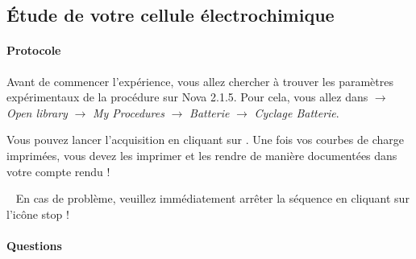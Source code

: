 \documentclass[twoside,a4paper,11pt,addpoints]{exam}%
\begin{document}
\subsection{\'{E}tude de votre cellule électrochimique}

\paragraph*{Protocole}
Avant de commencer l'expérience, vous allez chercher à trouver les paramètres expérimentaux de la procédure sur Nova 2.1.5. Pour cela, vous allez dans {\faHome $\to$ \emph{Open library} $\to$ \emph{My Procedures} $\to$ \emph{Batterie} $\to$ \emph{Cyclage Batterie}}.


Vous pouvez lancer l'acquisition en cliquant sur \faPlay. Une fois vos courbes de charge imprimées, vous devez les imprimer et les rendre de manière documentées dans votre compte rendu !

\faWarning ~ En cas de problème, veuillez immédiatement arrêter la séquence en cliquant sur l'icône stop \faStop !

\paragraph*{Questions}
\end{document}
